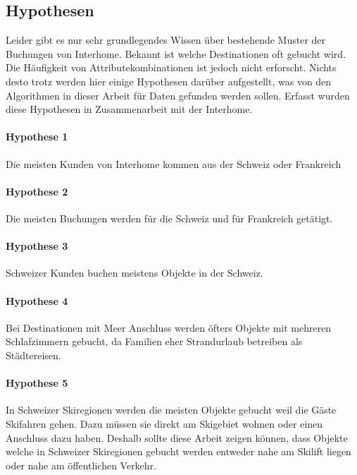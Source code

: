 \subsection{Hypothesen}
\label{sec:einleitung:ziel:hypothesen}
Leider gibt es nur sehr grundlegendes Wissen über bestehende Muster der Buchungen von Interhome. Bekannt ist welche Destinationen oft gebucht wird. Die Häufigkeit von Attributekombinationen ist jedoch nicht erforscht. Nichts desto trotz werden hier einige Hypothesen darüber aufgestellt, was von den Algorithmen in dieser Arbeit für Daten gefunden werden sollen. Erfasst wurden diese Hypothesen in Zusammenarbeit mit der Interhome.

\paragraph{Hypothese 1} Die meisten Kunden von Interhome kommen aus der Schweiz oder Frankreich
\paragraph{Hypothese 2} Die meisten Buchungen werden für die Schweiz und für Frankreich getätigt.
\paragraph{Hypothese 3} Schweizer Kunden buchen meistens Objekte in der Schweiz.
\paragraph{Hypothese 4} Bei Destinationen mit Meer Anschluss werden öfters Objekte mit mehreren Schlafzimmern gebucht, da Familien eher Strandurlaub betreiben als Städtereisen.
\paragraph{Hypothese 5} In Schweizer Skiregionen werden die meisten Objekte gebucht weil die Gäste Skifahren gehen. Dazu müssen sie direkt am Skigebiet wohnen oder einen Anschluss dazu haben. Deshalb sollte diese Arbeit zeigen können, dass Objekte welche in Schweizer Skiregionen gebucht werden entweder nahe am Skilift liegen oder nahe am öffentlichen Verkehr.

